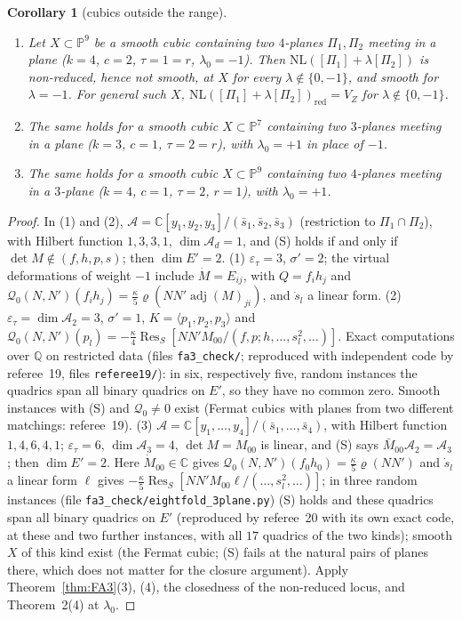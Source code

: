 \documentclass[11pt]{article}
\numberwithin{equation}{section}
\newtheorem{corollary}[theorem]{Corollary}
\theoremstyle{remark}
\newcommand{\PP}{\mathbb{P}}
\newcommand{\CC}{\mathbb{C}}
\newcommand{\QQ}{\mathbb{Q}}
\newcommand{\NL}{\mathrm{NL}}
\newcommand{\VZ}{V_Z}
\newcommand{\cA}{\mathcal{A}}
\newcommand{\Res}{\operatorname{Res}}
\newcommand{\lz}{\lambda_0}
\newcommand{\et}{\varepsilon_\tau}
\begin{document}
\begin{corollary}[cubics outside the range]\label{cor:eight}
\begin{enumerate}
\item Let $X\subset\PP^9$ be a smooth cubic containing two $4$-planes $\Pi_1,\Pi_2$ meeting in a plane
($k=4$, $c=2$, $\tau=1=r$, $\lz=-1$). Then $\NL([\Pi_1]+\lambda[\Pi_2])$ is non-reduced, hence not smooth, at $X$
for every $\lambda\notin\{0,-1\}$, and smooth for $\lambda=-1$. For general such $X$,
$\NL([\Pi_1]+\lambda[\Pi_2])_{\mathrm{red}}=\VZ$ for $\lambda\notin\{0,-1\}$.
\item The same holds for a smooth cubic $X\subset\PP^7$ containing two $3$-planes meeting in a plane
($k=3$, $c=1$, $\tau=2=r$), with $\lz=+1$ in place of $-1$.
\item The same holds for a smooth cubic $X\subset\PP^9$ containing two $4$-planes meeting in a $3$-plane
($k=4$, $c=1$, $\tau=2$, $r=1$), with $\lz=+1$.
\end{enumerate}
\end{corollary}
\begin{proof}
In (1) and (2), $\cA=\CC[y_1,y_2,y_3]/(\bar s_1,\bar s_2,\bar s_3)$ (restriction to $\Pi_1\cap\Pi_2$), with Hilbert
function $1,3,3,1$, $\dim\cA_d=1$, and (S) holds if and only if $\det M\notin(f,h,p,s)$; then $\dim E'=2$.
(1) $\et=3$, $\sigma'=2$; the virtual deformations of weight $-1$ include $\dot M=E_{ij}$, with $Q=f_ih_j$ and
$\mathcal Q_0(N,N')(f_ih_j)=\frac\kappa5\varrho(NN'\operatorname{adj}(M)_{ji})$, and $\dot s_l$ a linear form.
(2) $\et=\dim\cA_2=3$, $\sigma'=1$, $K=\langle p_1,p_2,p_3\rangle$ and
$\mathcal Q_0(N,N')(p_l)=-\frac\kappa4\Res_S[NN'M_{00}/(f,p;h,\dots,s_l^2,\dots)]$. Exact computations over $\QQ$ on
restricted data (files \texttt{fa3\_check/}; reproduced with independent code by referee~19, files
\texttt{referee19/}): in six, respectively five, random instances the quadrics span all binary quadrics on
$E'$, so they have no common zero. Smooth instances with (S) and $\mathcal Q_0\ne0$ exist (Fermat cubics with
planes from two different matchings: referee~19). (3) $\cA=\CC[y_1,\dots,y_4]/(\bar s_1,\dots,\bar s_4)$, with Hilbert
function $1,4,6,4,1$; $\et=6$, $\dim\cA_3=4$, $\det M=M_{00}$ is linear, and (S) says $\bar M_{00}\cA_2=\cA_3$; then
$\dim E'=2$. Here $\dot M_{00}\in\CC$ gives $\mathcal Q_0(N,N')(f_0h_0)=\frac\kappa5\varrho(NN')$ and $\dot s_l$ a linear
form $\ell$ gives $-\frac\kappa5\Res_S[NN'M_{00}\ell/(\dots,s_l^2,\dots)]$; in three random instances (file
\texttt{fa3\_check/eightfold\_3plane.py}) (S) holds and these quadrics span all
binary quadrics on $E'$ (reproduced by referee~20 with its own exact code, at these and two further
instances, with all $17$ quadrics of the two kinds); smooth $X$ of this kind exist (the Fermat cubic; (S) fails
at the natural pairs of planes there, which does not matter for the closure argument). Apply Theorem~\ref{thm:FA3}(3), (4), the closedness of the
non-reduced locus, and Theorem~2(4) at $\lz$.
\end{proof}
\end{document}
